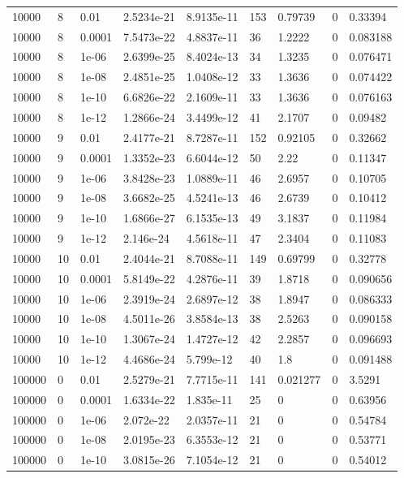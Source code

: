 \begin{tabular}{lllllllll}
10000 & 8 & 0.01 & 2.5234e-21 & 8.9135e-11 & 153 & 0.79739 & 0 & 0.33394 \\ 
10000 & 8 & 0.0001 & 7.5473e-22 & 4.8837e-11 & 36 & 1.2222 & 0 & 0.083188 \\ 
10000 & 8 & 1e-06 & 2.6399e-25 & 8.4024e-13 & 34 & 1.3235 & 0 & 0.076471 \\ 
10000 & 8 & 1e-08 & 2.4851e-25 & 1.0408e-12 & 33 & 1.3636 & 0 & 0.074422 \\ 
10000 & 8 & 1e-10 & 6.6826e-22 & 2.1609e-11 & 33 & 1.3636 & 0 & 0.076163 \\ 
10000 & 8 & 1e-12 & 1.2866e-24 & 3.4499e-12 & 41 & 2.1707 & 0 & 0.09482 \\ 
10000 & 9 & 0.01 & 2.4177e-21 & 8.7287e-11 & 152 & 0.92105 & 0 & 0.32662 \\ 
10000 & 9 & 0.0001 & 1.3352e-23 & 6.6044e-12 & 50 & 2.22 & 0 & 0.11347 \\ 
10000 & 9 & 1e-06 & 3.8428e-23 & 1.0889e-11 & 46 & 2.6957 & 0 & 0.10705 \\ 
10000 & 9 & 1e-08 & 3.6682e-25 & 4.5241e-13 & 46 & 2.6739 & 0 & 0.10412 \\ 
10000 & 9 & 1e-10 & 1.6866e-27 & 6.1535e-13 & 49 & 3.1837 & 0 & 0.11984 \\ 
10000 & 9 & 1e-12 & 2.146e-24 & 4.5618e-11 & 47 & 2.3404 & 0 & 0.11083 \\ 
10000 & 10 & 0.01 & 2.4044e-21 & 8.7088e-11 & 149 & 0.69799 & 0 & 0.32778 \\ 
10000 & 10 & 0.0001 & 5.8149e-22 & 4.2876e-11 & 39 & 1.8718 & 0 & 0.090656 \\ 
10000 & 10 & 1e-06 & 2.3919e-24 & 2.6897e-12 & 38 & 1.8947 & 0 & 0.086333 \\ 
10000 & 10 & 1e-08 & 4.5011e-26 & 3.8584e-13 & 38 & 2.5263 & 0 & 0.090158 \\ 
10000 & 10 & 1e-10 & 1.3067e-24 & 1.4727e-12 & 42 & 2.2857 & 0 & 0.096693 \\ 
10000 & 10 & 1e-12 & 4.4686e-24 & 5.799e-12 & 40 & 1.8 & 0 & 0.091488 \\ 
100000 & 0 & 0.01 & 2.5279e-21 & 7.7715e-11 & 141 & 0.021277 & 0 & 3.5291 \\ 
100000 & 0 & 0.0001 & 1.6334e-22 & 1.835e-11 & 25 & 0 & 0 & 0.63956 \\ 
100000 & 0 & 1e-06 & 2.072e-22 & 2.0357e-11 & 21 & 0 & 0 & 0.54784 \\ 
100000 & 0 & 1e-08 & 2.0195e-23 & 6.3553e-12 & 21 & 0 & 0 & 0.53771 \\ 
100000 & 0 & 1e-10 & 3.0815e-26 & 7.1054e-12 & 21 & 0 & 0 & 0.54012 \\ 

\end{tabular}
